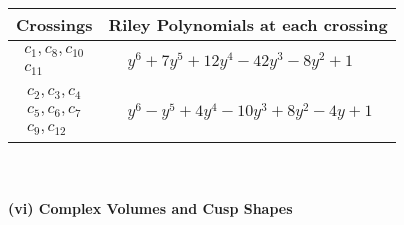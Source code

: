 \documentclass[1p]{elsarticle_modified}
\theoremstyle{definition}
\begin{document}
\begin{tabular}{m{50pt}|m{274pt}}
Crossings & \hspace{64pt}Riley Polynomials at each crossing \\
\hline $$\begin{aligned}c_{1},c_{8},c_{10}\\c_{11}\end{aligned}$$&$\begin{aligned}
&y^6+7 y^5+12 y^4-42 y^3-8 y^2+1
\end{aligned}$\\
\hline $$\begin{aligned}c_{2},c_{3},c_{4}\\c_{5},c_{6},c_{7}\\c_{9},c_{12}\end{aligned}$$&$\begin{aligned}
&y^6- y^5+4 y^4-10 y^3+8 y^2-4 y+1
\end{aligned}$\\
\hline
\end{tabular}\\~\\
\newpage\flushleft \textbf{(vi) Complex Volumes and Cusp Shapes}
\end{document}
